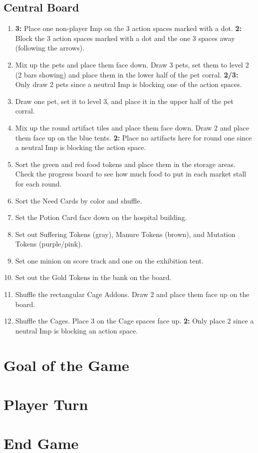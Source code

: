 \documentclass[12pt]{article}
\newenvironment{enumerateCustom}
{\begin{enumerate}
  \setlength{\itemsep}{1pt}
  \setlength{\parskip}{0pt}
  \setlength{\parsep}{0pt}}
{\end{enumerate}}
\begin{document}
\begin{mdframed}[style = customFrame]
\begin{multicols*}{2}
\subsection*{Central Board}
\begin{enumerateCustom}
	\item \textbf{3:} Place one non-player Imp on the 3 action spaces marked with a dot. \textbf{2:} Block the 3 action spaces marked with a dot and the one 3 spaces away (following the arrows).
	\item Mix up the pets and place them face down. Draw 3 pets, set them to level 2 (2 bars showing) and place them in the lower half of the pet corral. \textbf{2/3:} Only draw 2 pets since a neutral Imp is blocking one of the action spaces.
	\item Draw one pet, set it to level 3, and place it in the upper half of the pet corral.
	\item Mix up the round artifact tiles and place them face down. Draw 2 and place them face up on the blue tents. \textbf{2:} Place no artifacts here for round one since a neutral Imp is blocking the action space.
	\item Sort the green and red food tokens and place them in the storage areas. Check the progress board to see how much food to put in each market stall for each round.
	\item Sort the Need Cards by color and shuffle.
	\item Set the Potion Card face down on the hospital building.
	\item Set out Suffering Tokens (gray), Manure Tokens (brown), and Mutation Tokens (purple/pink).
	\item Set one minion on score track and one on the exhibition tent.
	\item Set out the Gold Tokens in the bank on the board.
	\item Shuffle the rectangular Cage Addons. Draw 2 and place them face up on the board.
	\item Shuffle the Cages. Place 3 on the Cage spaces face up. \textbf{2:} Only place 2 since a neutral Imp is blocking an action space.
\end{enumerateCustom}

\section*{Goal of the Game}
\section*{Player Turn}
\section*{End Game}

\end{multicols*}
\end{mdframed}
\end{document}
